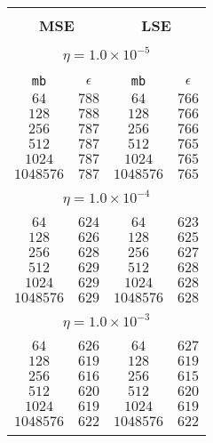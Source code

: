 \begin{center}
\begin{table}[]
\begin{center}
\begin{tabular}{@{}cc|cc@{}}
\hline\\[-11pt]
\hline\\[-6.5pt]
\multicolumn{2}{c}{\bf MSE} & \multicolumn{2}{c}{\bf LSE } \\[5pt]
\hline\\[-11pt]
\multicolumn{4}{c}{$\eta = 1.0\times 10^{-5}$} \\[5pt]
\hline\\[-11pt]
\texttt{mb} & \texttt{$\epsilon$} & \texttt{mb} & \texttt{$\epsilon$} \\[1pt]
$64$ & $788$  & $64$ & $766$ \\  [1pt]
$128$ & $788$   & $128$ & $766$ \\  [1pt]
$256$ & $787$   & $256$ & $766$ \\  [1pt]
$512$ & $787$   & $512$ & $765$ \\  [1pt]
$1024$ & $787$ & $1024$ & $765$ \\  [1pt]
$1048576$ & $787$   & $1048576$ & $765$ \\  [1pt]
\hline\\[-11pt]
\multicolumn{4}{c}{$\eta = 1.0\times 10^{-4}$} \\[5pt]
\hline\\[-11pt]
$64$ & $624$  & $64$ & $623$ \\  [1pt]
$128$ & $626$  & $128$ & $625$ \\  [1pt]
$256$ & $628$  & $256$ & $627$ \\  [1pt]
$512$ & $629$  & $512$ & $628$ \\  [1pt]
$1024$ & $629$  & $1024$ & $628$ \\  [1pt]
$1048576$ & $629$   & $1048576$ & $628$ \\  [1pt]
\hline\\[-11pt]
\multicolumn{4}{c}{$\eta = 1.0\times 10^{-3}$} \\[5pt]
\hline\\[-11pt]
$64$ & $626$  & $64$ & $627$ \\  [1pt]
$128$ & $619$  & $128$ & $619$ \\  [1pt]
$256$ & $616$  & $256$ & $615$ \\  [1pt]
$512$ & $620$  & $512$ & $620$ \\  [1pt]
$1024$ & $619$  & $1024$ & $619$ \\  [1pt]
$1048576$ & $622$   & $1048576$ & $622$ \\  [1pt]
\hline\\[-11pt]


\end{tabular}
\end{center}
\end{table}
\end{center}
